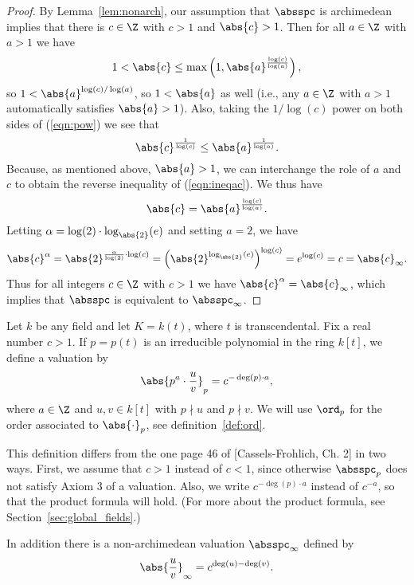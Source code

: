 \documentclass[11pt]{book}
\begin{document}
\begin{ch}
\begin{proof}
By Lemma~\ref{lem:nonarch}, our assumption that $\absspc$ is archimedean implies
that there is $c\in\Z$ with $c>1$ and $\abs{c}>1$.
Then for all $a\in\Z$ with $a>1$ we have
\begin{equation}\label{eqn:pow}
  1 < \abs{c} \leq
  \max\left(1,\abs{a}^{\frac{\log(c)}{\log(a)}}\right),
\end{equation}
so $1<\abs{a}^{\log(c)/\log(a)}$, so
$1<\abs{a}$ as well (i.e., any $a\in\Z$ with
$a>1$ automatically satisfies $\abs{a}>1$).  Also, taking the
$1/\log(c)$ power on both sides of (\ref{eqn:pow})
we see that
\begin{equation}\label{eqn:ineqac}
  \abs{c}^{\frac{1}{\log(c)}}
    \leq   \abs{a}^{\frac{1}{\log(a)}}.
\end{equation}
Because, as mentioned above, $\abs{a}>1$, we can interchange the role
of $a$ and $c$ to obtain the reverse inequality of (\ref{eqn:ineqac}).
We thus have
$$
  \abs{c}
    =   \abs{a}^{\frac{\log(c)}{\log(a)}}.
$$ Letting $\alpha=\log(2)\cdot \log_{\abs{2}}(e)$ and setting $a=2$,
we have
$$
  \abs{c}^{\alpha} = \abs{2}^{\frac{\alpha}{\log(2)}\cdot \log(c)}
      = \left(\abs{2}^{\log_{\abs{2}}(e)}\right)^{\log(c)} =
   e^{\log(c)} = c = \abs{c}_\infty.
$$
Thus for all integers $c\in\Z$ with $c>1$ we have
$\abs{c}^{\alpha} = \abs{c}_{\infty}$, which implies
that $\absspc$ is equivalent to $\absspc_\infty$.
\end{proof}

Let $k$ be any field and let $K=k(t)$, where $t$
is transcendental.  Fix a real number $c>1$.
If $p=p(t)$ is an irreducible
polynomial in the ring $k[t]$, we define a valuation
by
\begin{equation}\label{eqn:ffabsp}
  \abs{p^a \cdot \frac{u}{v}}_p = c^{-\deg(p)\cdot a},
\end{equation}
where $a\in\Z$ and $u,v\in k[t]$ with
$p\nmid u$ and $p\nmid v$. We will use $\ord_p$ for the
order associated to $\abs{\cdot}_p$, see definition~\ref{def:ord}.
\begin{remark}
This definition differs from the one page 46 of [Cassels-Frohlich,
Ch. 2] in two ways.   First, we assume that $c>1$ instead
of $c<1$, since otherwise $\absspc_p$ does not satisfy
Axiom 3 of a valuation.  Also, we write $c^{-\deg(p)\cdot a}$
instead of $c^{-a}$, so that the product formula will
hold.  (For more about the product formula, see
Section~\ref{sec:global_fields}.)
\end{remark}
In addition there is a non-archimedean valuation
$\absspc_\infty$ defined by
\begin{equation}\label{eqn:ffabsoo}
  \abs{\frac{u}{v}}_\infty = c^{\deg(u)-\deg(v)}.
\end{equation}



\end{ch}
\end{document}
